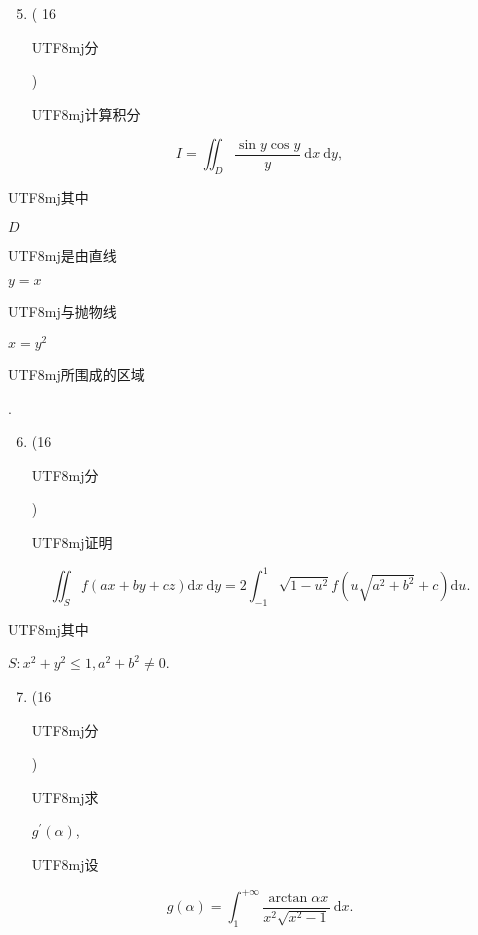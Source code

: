 \documentclass[10pt]{article}
\begin{document}
\begin{enumerate}
  \setcounter{enumi}{4}
  \item ( 16 \begin{CJK}{UTF8}{mj}分\end{CJK}) \begin{CJK}{UTF8}{mj}计算积分\end{CJK}
\end{enumerate}
$$
I=\iint_{D} \frac{\sin y \cos y}{y} \mathrm{~d} x \mathrm{~d} y,
$$
\begin{CJK}{UTF8}{mj}其中\end{CJK} $D$ \begin{CJK}{UTF8}{mj}是由直线\end{CJK} $y=x$ \begin{CJK}{UTF8}{mj}与抛物线\end{CJK} $x=y^{2}$ \begin{CJK}{UTF8}{mj}所围成的区域\end{CJK}.

\begin{enumerate}
  \setcounter{enumi}{5}
  \item (16 \begin{CJK}{UTF8}{mj}分\end{CJK}) \begin{CJK}{UTF8}{mj}证明\end{CJK}
\end{enumerate}
$$
\iint_{S} f(a x+b y+c z) \mathrm{d} x \mathrm{~d} y=2 \int_{-1}^{1} \sqrt{1-u^{2}} f\left(u \sqrt{a^{2}+b^{2}}+c\right) \mathrm{d} u .
$$
\begin{CJK}{UTF8}{mj}其中\end{CJK} $S: x^{2}+y^{2} \leqslant 1, a^{2}+b^{2} \neq 0$.

\begin{enumerate}
  \setcounter{enumi}{6}
  \item (16 \begin{CJK}{UTF8}{mj}分\end{CJK}) \begin{CJK}{UTF8}{mj}求\end{CJK} $g^{\prime}(\alpha)$, \begin{CJK}{UTF8}{mj}设\end{CJK}
\end{enumerate}
$$
g(\alpha)=\int_{1}^{+\infty} \frac{\arctan \alpha x}{x^{2} \sqrt{x^{2}-1}} \mathrm{~d} x .
$$
\end{document}
